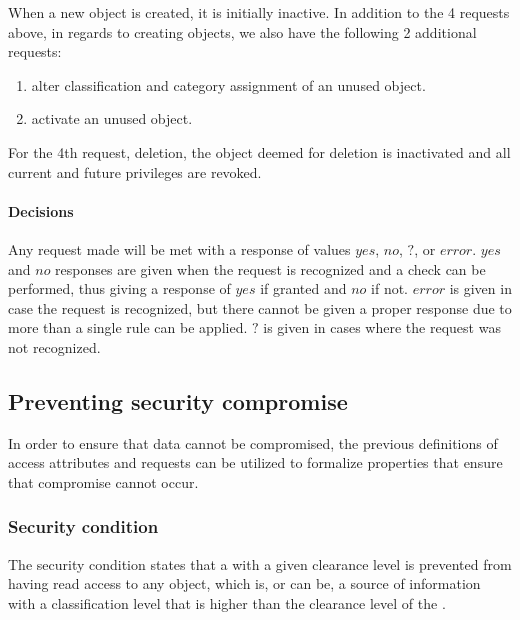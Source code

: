 When a new object is created, it is initially inactive.
In addition to the 4 requests above, in regards to creating objects, we also have the following 2 additional requests:
\begin{enumerate}
  \item alter classification and category assignment of an unused object.
  \item activate an unused object.
\end{enumerate}

For the 4th request, deletion, the object deemed for deletion is inactivated and all current and future privileges are revoked.

\paragraph{Decisions}
Any request made will be met with a response of values $yes$, $no$, $?$, or $error$.
$yes$ and $no$ responses are given when the request is recognized and a check can be performed, thus giving a response of $yes$ if granted and $no$ if not.
$error$ is given in case the request is recognized, but there cannot be given a proper response due to more than a single rule can be applied.
$?$ is given in cases where the request was not recognized.
 
\subsection{Preventing security compromise}\label{bellap:properties}
In order to ensure that data cannot be compromised, the previous definitions of access attributes and requests can be utilized to formalize properties that ensure that compromise cannot occur.

\subsubsection{Security condition}
The security condition states that a \principal{} with a given clearance level is prevented from having read access to any object, which is, or can be, a source of information with a classification level that is higher than the clearance level of the \principal{}.

